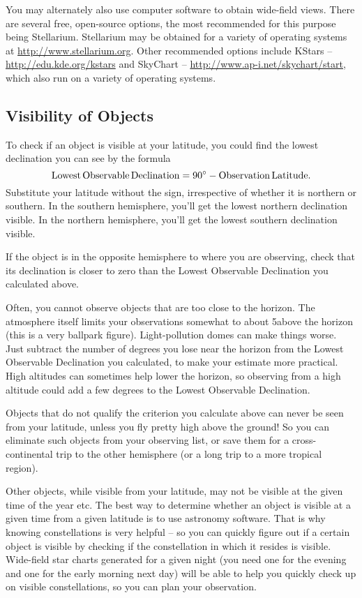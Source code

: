 You may alternately also use computer software to obtain wide-field
views. There are several free, open-source options, the most
recommended for this purpose being Stellarium. Stellarium may be
obtained for a variety of operating systems at
\url{http://www.stellarium.org}. Other recommended options include
KStars -- \url{http://edu.kde.org/kstars} and SkyChart --
\url{http://www.ap-i.net/skychart/start}, which also run on a variety
of operating systems.

\subsection{Visibility of Objects}
To check if an object is visible at your latitude, you could find the
lowest declination you can see by the formula
\begin{equation}
\mathrm{Lowest\,Observable\,Declination} = 90^\circ -
\mathrm{Observation\,Latitude}.
\end{equation}
Substitute your latitude without the sign, irrespective of whether it
is northern or southern. In the southern hemisphere, you'll get the
lowest northern declination visible. In the northern hemisphere,
you'll get the lowest southern declination visible.

If the object is in the opposite hemisphere to where you are
observing, check that its declination is closer to zero than the
Lowest Observable Declination you calculated above.

Often, you cannot observe objects that are too close to the
horizon. The atmosphere itself limits your observations somewhat to
about 5\circdegree above the horizon (this is a very ballpark
figure). Light-pollution domes can make things worse. Just subtract
the number of degrees you lose near the horizon from the Lowest
Observable Declination you calculated, to make your estimate more
practical. High altitudes can sometimes help lower the horizon, so
observing from a high altitude could add a few degrees to the Lowest
Observable Declination.

Objects that do not qualify the criterion you calculate above can
never be seen from your latitude, unless you fly pretty high above the
ground! So you can eliminate such objects from your observing list, or
save them for a cross-continental trip to the other hemisphere (or a
long trip to a more tropical region).

Other objects, while visible from your latitude, may not be visible at
the given time of the year etc. The best way to determine whether an
object is visible at a given time from a given latitude is to use
astronomy software. That is why knowing constellations is very helpful
-- so you can quickly figure out if a certain object is visible by
checking if the constellation in which it resides is
visible. Wide-field star charts generated for a given night (you need
one for the evening and one for the early morning next day) will be
able to help you quickly check up on visible constellations, so you
can plan your observation.

